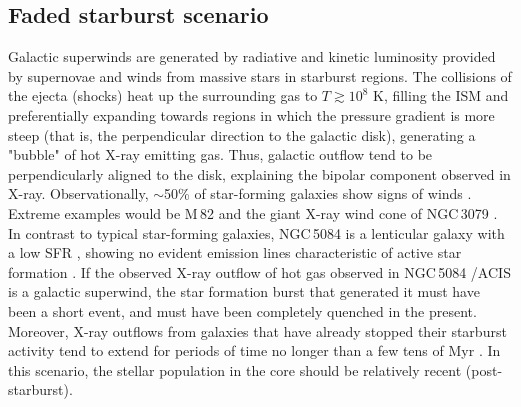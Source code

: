 \documentclass[modern]{CORE-AAS/aastex631}
\begin{document}
\subsection{Faded starburst scenario}
\label{subsec:discussion_fadedstarburst}
Galactic superwinds \citep[][]{heckman+1993inproceedings_455} are generated by  radiative and kinetic luminosity provided by supernovae and winds from massive stars in starburst regions. The collisions of the ejecta (shocks) heat up the surrounding gas to $T\gtrsim10^{8}$ K, filling the ISM and preferentially expanding towards regions in which the pressure gradient is more steep (that is, the perpendicular direction to the galactic disk), generating a "bubble" of hot X-ray emitting gas. Thus, galactic outflow tend to be perpendicularly aligned to the disk, explaining the bipolar component observed in X-ray. 
Observationally, $\sim$50\% of star-forming galaxies show signs of winds \citep[][]{rubin+2014apj794_156}. Extreme examples would be M\,82 \citep{shopbell+1998apj493_129,heckman+2017incollection_2431} and the giant X-ray wind cone of NGC\,3079 \citep[$R\sim3$ arcmin, 16.3~kpc,][]{hodgeskluck+2020apj903_35}. In contrast to typical star-forming galaxies, NGC\,5084 is a lenticular galaxy with a low SFR \citep[$0.128\pm0.016$ M$_{\odot}$ yr$^{-1}$,][]{osullivan+2018aap618_126}, showing no evident emission lines characteristic of active star formation \citep[][see Fig.\,\ref{fig:NGC5084_optical_spectra}]{moustakas+2006apj164_81}. If the observed X-ray outflow of hot gas observed in NGC\,5084 \Chandra/ACIS is a galactic superwind, the star formation burst that generated it must have been a short event, and must have been completely quenched in the present. Moreover, X-ray outflows from galaxies that have already stopped their starburst activity tend to extend for periods of time no longer than a few tens of Myr \citep{mcquinn+2018mnras477_3164}.  In this scenario, the stellar population in the core should be relatively recent (post-starburst).
\end{document}
